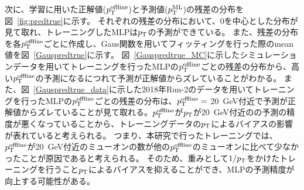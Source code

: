 次に、学習に用いた正解値($p_{\rm{T}}^{\rm{offline}}$)と予測値($p_{\rm{T}}^{\rm{ML}}$)の残差の分布を図~\ref{fig:predtrue}に示す。
それぞれの残差の分布において、0を中心とした分布が見て取れ、トレーニングしたMLPは$p_{\rm{T}}$の予測ができている。
また、残差の分布を各$p_{\rm{T}}^{\rm{offline}}$ごとに作成し、Gaus関数を用いてフィッティングを行った際のmean値を図~\ref{Gauspredtrue}に示す。
図~\ref{Gauspredtrue_MC}に示したシミュレーションデータを用いてトレーニングを行ったMLPの$p_{\rm{T}}^{\rm{offline}}$ごとの残差の分布から、高い$p_{\rm{T}}^{\rm{offline}}$の予測になるにつれて予測が正解値からズレていることがわかる。
また、図~\ref{Gauspredtrue_data}に示した2018年Run-2のデータを用いてトレーニングを行ったMLPの$p_{\rm{T}}^{\rm{offline}}$ごとの残差の分布は、$p_{\rm{T}}^{\rm{offline}}=$ 20~GeV付近で予測が正解値からズレていることが見て取れる。$p_{\rm{T}}^{\rm{offline}}$が$p_{\rm{T}}$が20~GeV付近のの予測の精度が悪くなっていることから、トレーニングデータの$p_{\rm{T}}$によるバイアスの影響が表れていると考えられる。
つまり、本研究で行ったトレーニングでは、$p_{\rm{T}}^{\rm{offline}}$が20~GeV付近のミューオンの数が他の$p_{\rm{T}}^{\rm{offline}}$のミューオンに比べて少なかったことが原因であると考えられる。
そのため、重みとして$1/p_{\rm{T}}$をかけたトレーニングを行うこと$p_{\rm{T}}$によるバイアスを抑えることができ、MLPの予測精度が向上する可能性がある。


